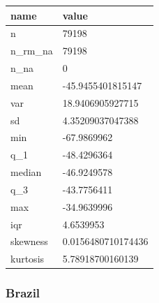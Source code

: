\documentclass[
  12pt,
  a4paper,
  oneside]{tesesusp}
\begin{document}
\begin{table}
\centering
\begin{tabular}{l|l}
\hline
name & value\\
\hline
n & 79198\\
\hline
n\_rm\_na & 79198\\
\hline
n\_na & 0\\
\hline
mean & -45.9455401815147\\
\hline
var & 18.9406905927715\\
\hline
sd & 4.35209037047388\\
\hline
min & -67.9869962\\
\hline
q\_1 & -48.4296364\\
\hline
median & -46.9249578\\
\hline
q\_3 & -43.7756411\\
\hline
max & -34.9639996\\
\hline
iqr & 4.6539953\\
\hline
skewness & 0.0156480710174436\\
\hline
kurtosis & 5.78918700160139\\
\hline
\end{tabular}
\end{table}

\hypertarget{brazil}{%
\subsubsection{Brazil}\label{brazil}}
\end{document}
